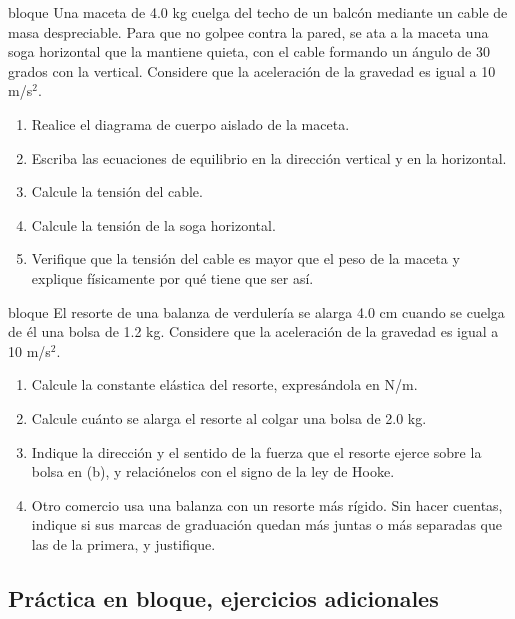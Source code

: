 \documentclass[11pt,openany]{book}
\begin{document}
\begin{ejercicio}{bloque}
Una maceta de 4.0 kg cuelga del techo de un balcón mediante un cable de masa despreciable. Para que no golpee contra la pared, se ata a la maceta una soga horizontal que la mantiene quieta, con el cable formando un ángulo de 30 grados con la vertical. Considere que la aceleración de la gravedad es igual a 10 m/s$^2$.
\begin{enumerate}[label=(\alph*), leftmargin=1.7em, itemsep=1pt, topsep=3pt]
  \item Realice el diagrama de cuerpo aislado de la maceta.
  \item Escriba las ecuaciones de equilibrio en la dirección vertical y en la horizontal.
  \item Calcule la tensión del cable.
  \item Calcule la tensión de la soga horizontal.
  \item Verifique que la tensión del cable es mayor que el peso de la maceta y explique físicamente por qué tiene que ser así.
\end{enumerate}
\end{ejercicio}

\begin{ejercicio}{bloque}
El resorte de una balanza de verdulería se alarga 4.0 cm cuando se cuelga de él una bolsa de 1.2 kg. Considere que la aceleración de la gravedad es igual a 10 m/s$^2$.
\begin{enumerate}[label=(\alph*), leftmargin=1.7em, itemsep=1pt, topsep=3pt]
  \item Calcule la constante elástica del resorte, expresándola en N/m.
  \item Calcule cuánto se alarga el resorte al colgar una bolsa de 2.0 kg.
  \item Indique la dirección y el sentido de la fuerza que el resorte ejerce sobre la bolsa en (b), y relaciónelos con el signo de la ley de Hooke.
  \item Otro comercio usa una balanza con un resorte más rígido. Sin hacer cuentas, indique si sus marcas de graduación quedan más juntas o más separadas que las de la primera, y justifique.
\end{enumerate}
\end{ejercicio}

\subsection{Práctica en bloque, ejercicios adicionales}
\end{document}
